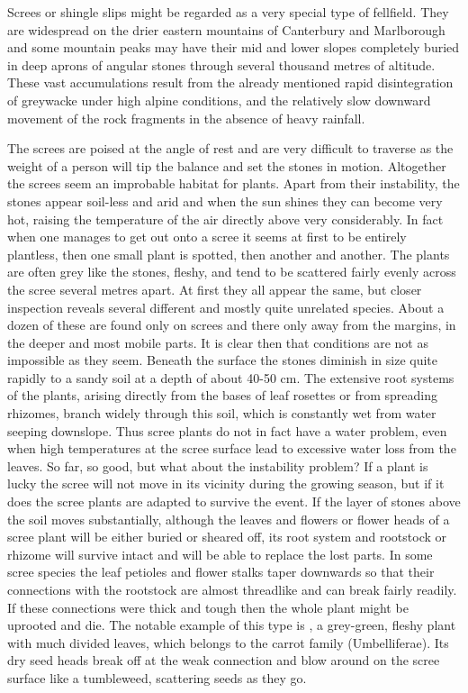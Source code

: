 Screes or shingle slips might be regarded as a very special type of fellfield.
They are widespread on the drier eastern mountains of Canterbury and Marlborough and some mountain peaks may have their mid and lower slopes completely buried in deep aprons of angular stones through several thousand metres of altitude.
These vast accumulations result from the already mentioned rapid disintegration of greywacke under high alpine conditions, and the relatively slow downward movement of the rock fragments in the absence of heavy rainfall.

The screes are poised at the angle of rest and are very difficult to traverse as the weight of a person will tip the balance and set the stones in motion.
Altogether the screes seem an improbable habitat for plants.
Apart from their instability, the stones appear soil-less and arid and when the sun shines they can become very hot, raising the temperature of the air directly above very considerably.
In fact when one manages to get out onto a scree it seems at first to be entirely plantless, then one small plant is spotted, then another and another.
The plants are often grey like the stones, fleshy, and tend to be scattered fairly evenly across the scree several metres apart.
At first they all appear the same, but closer inspection reveals several different and mostly quite unrelated species.
About a dozen of these are found only on screes and there only away from the margins, in the deeper and most mobile parts.
It is clear then that conditions are not as impossible as they seem.
Beneath the surface the stones diminish in size quite rapidly to a sandy soil at a depth of about 40-50 cm.
The extensive root systems of the plants, arising directly from the bases of leaf rosettes or from spreading rhizomes, branch widely through this soil, which is constantly wet from water seeping downslope.
Thus scree plants do not in fact have a water problem, even when high temperatures at the scree surface lead to excessive water loss from the leaves.
So far, so good, but what about the instability problem? If a plant is lucky the scree will not move in its vicinity during the growing season, but if it does the scree plants are adapted to survive the event.
If the layer of stones above the soil moves substantially, although the leaves and flowers or flower heads of a scree plant will be either buried or sheared off, its root system and rootstock or rhizome will survive intact and will be able to replace the lost parts.
In some scree species the leaf petioles and flower stalks taper downwards so that their connections with the rootstock are almost threadlike and can break fairly readily.
If these connections were thick and tough then the whole plant might be uprooted and die.
The notable example of this type is , a grey-green, fleshy plant with much divided leaves, which belongs to the carrot family (Umbelliferae).
Its dry seed heads break off at the weak connection and blow around on the scree surface like a tumbleweed, scattering seeds as they go.

